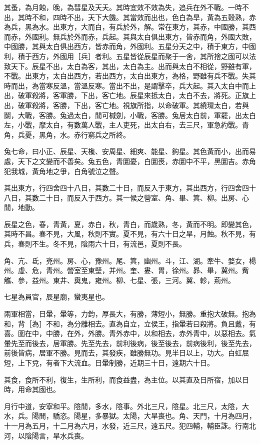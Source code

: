 其蚤，為月蝕，晚，為彗星及天夭。其時宜效不效為失，追兵在外不戰。一時不出，其時不和，四時不出，天下大饑。其當效而出也，色白為旱，黃為五穀熟，赤為兵，黑為水。出東方，大而白，有兵於外，解。常在東方，其赤，中國勝，其西而赤，外國利。無兵於外而赤，兵起。其與太白俱出東方，皆赤而角，外國大敗，中國勝，其與太白俱出西方，皆赤而角，外國利。五星分天之中，積于東方，中國利，積于西方，外國用［兵］者利。五星皆從辰星而聚于一舍，其所捨之國可以法致天下。辰星不出，太白為客，其出，太白為主。出而與太白不相從，野雖有軍，不戰。出東方，太白出西方，若出西方，太白出東方，為格，野雖有兵不戰。失其時而出，為當寒反溫，當溫反寒。當出不出，是謂擊卒，兵大起。其入太白中而上出，破軍殺將，客軍勝，下出，客亡地。辰星來抵太白，太白不去，將死。正旗上出，破軍殺將，客勝，下出，客亡地。視旗所指，以命破軍。其繞環太白，若與鬬，大戰，客勝。兔過太白，閒可椷劍，小戰，客勝。兔居太白前，軍罷，出太白左，小戰，摩太白，有數萬人戰，主人吏死，出太白右，去三尺，軍急約戰。青角，兵憂，黑角，水。赤行窮兵之所終。

兔七命，曰小正、辰星、天欃、安周星、細爽、能星、鉤星。其色黃而小，出而易處，天下之文變而不善矣。兔五色，青圜憂，白圜喪，赤圜中不平，黑圜吉。赤角犯我城，黃角地之爭，白角號泣之聲。

其出東方，行四舍四十八日，其數二十日，而反入于東方，其出西方，行四舍四十八日，其數二十日，而反入于西方。其一候之營室、角、畢、箕、柳。出房、心閒，地動。

辰星之色，春，青黃，夏，赤白，秋，青白，而歲熟，冬，黃而不明。即變其色，其時不昌。春不見，大風，秋則不實。夏不見，有六十日之旱，月蝕。秋不見，有兵，春則不生。冬不見，陰雨六十日，有流邑，夏則不長。

角、亢、氐，兗州。房、心，豫州。尾、箕，幽州。斗，江、湖。牽牛、婺女，楊州。虛、危，青州。營室至東壁，并州。奎、婁、胃，徐州。昴、畢，冀州。觜觿、參，益州。東井、輿鬼，雍州。柳、七星、張，三河。翼、軫，荊州。

七星為員官，辰星廟，蠻夷星也。

兩軍相當，日暈，暈等，力鈞，厚長大，有勝，薄短小，無勝。重抱大破無。抱為和，背［為］不和，為分離相去。直為自立，立侯王，指暈若曰殺將。負且戴，有喜。圍在中，中勝，在外，外勝。青外赤中，以和相去，赤外青中，以惡相去。氣暈先至而後去，居軍勝。先至先去，前利後病，後至後去，前病後利，後至先去，前後皆病，居軍不勝。見而去，其發疾，雖勝無功。見半日以上，功大。白虹屈短，上下兌，有者下大流血。日暈制勝，近期三十日，遠期六十日。

其食，食所不利，復生，生所利，而食益盡，為主位。以其直及日所宿，加以日時，用命其國也。

月行中道，安寧和平。陰閒，多水，陰事。外北三尺，陰星。北三尺，太陰，大水，兵。陽閒，驕恣。陽星，多暴獄。太陽，大旱喪也。角、天門，十月為四月，十一月為五月，十二月為六月，水發，近三尺，遠五尺。犯四輔，輔臣誅。行南北河，以陰陽言，旱水兵喪。

